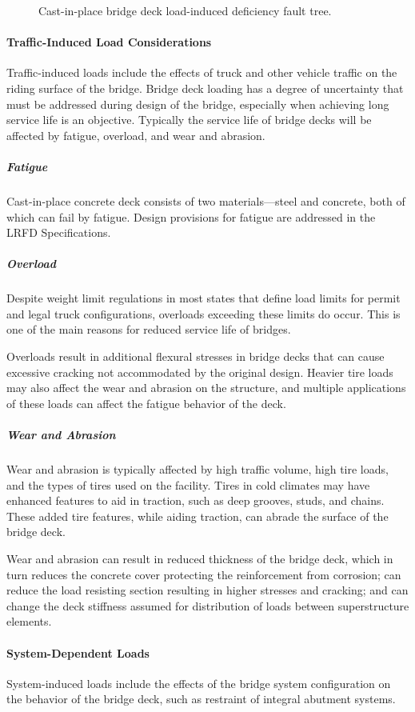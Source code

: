 \begin{figure}
  \caption{Cast-in-place bridge deck load-induced deficiency fault tree.}
  \label{fig:fault-tree-cip-bridge-deck}
\end{figure}

\paragraph{Traffic-Induced Load Considerations}
Traffic-induced loads include the effects of truck and other vehicle traffic on the riding surface of the bridge. Bridge deck loading has a degree of uncertainty that must be addressed during design of the bridge, especially when achieving long service life is an objective. Typically the service life of bridge decks will be affected by fatigue, overload, and wear and abrasion.

\subparagraph*{Fatigue}
Cast-in-place concrete deck consists of two materials—steel and concrete, both of which can fail by fatigue. Design provisions for fatigue are addressed in the LRFD Specifications.

\subparagraph*{Overload}
Despite weight limit regulations in most states that define load limits for permit and legal truck configurations, overloads exceeding these limits do occur. This is one of the main reasons for reduced service life of bridges.

Overloads result in additional flexural stresses in bridge decks that can cause excessive cracking not accommodated by the original design. Heavier tire loads may also affect the wear and abrasion on the structure, and multiple applications of these loads can affect the fatigue behavior of the deck.
\subparagraph*{Wear and Abrasion}
Wear and abrasion is typically affected by high traffic volume, high tire loads, and the types of tires used on the facility. Tires in cold climates may have enhanced features to aid in traction, such as deep grooves, studs, and chains. These added tire features, while aiding traction, can abrade the surface of the bridge deck.

Wear and abrasion can result in reduced thickness of the bridge deck, which in turn reduces the concrete cover protecting the reinforcement from corrosion; can reduce the load resisting section resulting in higher stresses and cracking; and can change the deck stiffness assumed for distribution of loads between superstructure elements.


\paragraph{System-Dependent Loads}
\label{par:system-dependent-loads}
System-induced loads include the effects of the bridge system configuration on the behavior of the bridge deck, such as restraint of integral abutment systems.


